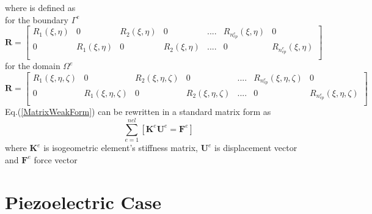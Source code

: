 \documentclass[11pt]{article}
\begin{document}
where  is defined as \\
for the boundary $\Gamma^e$ 
\begin{equation} \label{RMatrix1}
\textbf{R} =
\begin{bmatrix}
R_1(\xi,\eta) & 0 & R_2(\xi,\eta) &0 & .... & R_{n_{cp}^e}(\xi,\eta) & 0 \\
0 &R_1(\xi,\eta) & 0 & R_2(\xi,\eta) & .... & 0 & R_{n_{cp}^e}(\xi,\eta) \\
\end{bmatrix}
\end{equation}
for the domain $\Omega^e$
\begin{equation} \label{RMatrix2}
\textbf{R} =
\begin{bmatrix}
R_1(\xi,\eta,\zeta) & 0 & R_2(\xi,\eta,\zeta) &0 & .... &
R_{n_{cp}^e}(\xi,\eta,\zeta) & 0 \\
0 &R_1(\xi,\eta,\zeta) & 0 & R_2(\xi,\eta,\zeta) & .... & 0 &
R_{n_{cp}^e}(\xi,\eta,\zeta) \\
\end{bmatrix}
\end{equation}
Eq.(\ref{MatrixWeakForm}) can be rewritten in a standard matrix form as
\begin{equation}
\sum_{e=1}^{nel} [\textbf{K}^e \textbf{U}^e = \textbf{F}^e] 
\end{equation}
where $\textbf{K}^e$ is isogeometric element’s stiffness matrix, $\textbf{U}^e$
is displacement vector and $\textbf{F}^e$ force vector



\newpage

\section{Piezoelectric Case}
\end{document}
